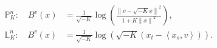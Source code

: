 \documentclass[border=8pt]{standalone}
\begin{document}
$\displaystyle
\begin{aligned}
\mathbb{P}^{n}_{K}:\quad B^{v}(x)
&=\frac{1}{\sqrt{-K}}\log\left(
\frac{\left\lVert v-\sqrt{-K}x\right\rVert^{2}}
{1+K\left\lVert x\right\rVert^{2}}
\right),\\[6pt]
\mathbb{L}^{n}_{K}:\quad B^{v}(x)
&=\frac{1}{\sqrt{-K}}\log\left(
\sqrt{-K}\left(x_t-\left\langle x_s,v\right\rangle\right)
\right).
\end{aligned}
$
\end{document}
